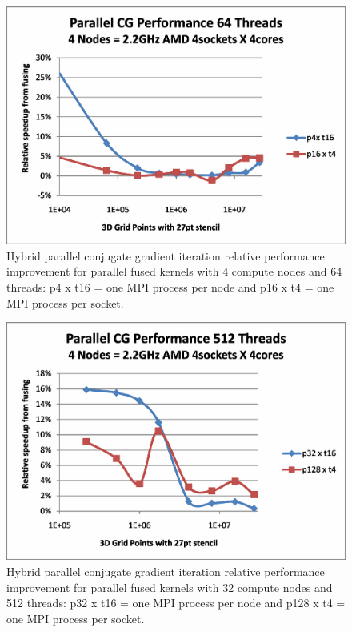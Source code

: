 \begin{figure}[h]
\center
\includegraphics[viewport=1in 0.5in 8.5in 7in,angle=0,scale=0.5]{test-hhpccg-intel-11.1-mpi.exe.np4.no-overlap.fusing.eps}
\caption{Hybrid parallel conjugate gradient iteration relative performance improvement for parallel fused kernels with 4 compute nodes and 64 threads: p4 x t16 = one MPI process per node and p16 x t4 = one MPI process per socket.}
\label{fig:CGPerf:np4:fusing}
\end{figure}

\begin{figure}[h]
\center
\includegraphics[viewport=1in 0.5in 8.5in 7in,angle=0,scale=0.5]{test-hhpccg-intel-11.1-mpi.exe.np32.no-overlap.fusing.eps}
\caption{Hybrid parallel conjugate gradient iteration relative performance improvement for parallel fused kernels with 32 compute nodes and 512 threads: p32 x t16 = one MPI process per node and p128 x t4 = one MPI process per socket.}
\label{fig:CGPerf:np32:fusing}
\end{figure}
















